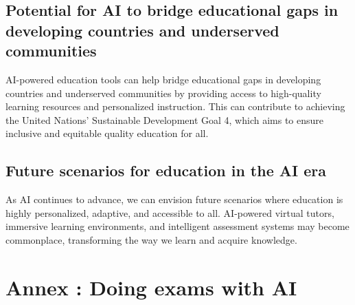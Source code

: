 \documentclass{article}
\begin{document}
\subsection{Potential for AI to bridge educational gaps in developing countries and underserved communities}
AI-powered education tools can help bridge educational gaps in developing countries and underserved communities by providing access to high-quality learning resources and personalized instruction. This can contribute to achieving the United Nations' Sustainable Development Goal 4, which aims to ensure inclusive and equitable quality education for all.

\subsection{Future scenarios for education in the AI era}
As AI continues to advance, we can envision future scenarios where education is highly personalized, adaptive, and accessible to all. AI-powered virtual tutors, immersive learning environments, and intelligent assessment systems may become commonplace, transforming the way we learn and acquire knowledge.

\newpage
\newpage
\section*{Annex : Doing exams with AI}

\cite{einstein}




\end{document}
